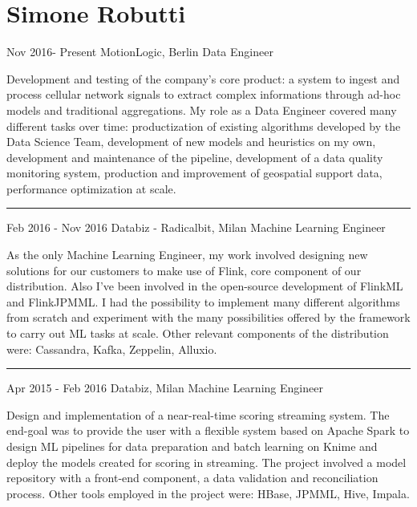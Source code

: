\documentclass{tccv}
\begin{document}
\part{Simone Robutti}

\begin{eventlist}

\item{Nov 2016- Present}
     {MotionLogic, Berlin}
     {Data Engineer}

Development and testing of the company's core product: a system to ingest and process cellular network signals to extract complex informations through ad-hoc models and traditional aggregations. My role as a Data Engineer covered many different tasks over time: productization of existing algorithms developed by the Data Science Team, development of new models and heuristics on my own, development and maintenance of the pipeline, development of a data quality monitoring system, production and improvement of geospatial support data, performance optimization at scale.


\noindent\hfil\rule{0.3\textwidth}{.4pt}

\item{Feb 2016 - Nov 2016}
{Databiz - Radicalbit, Milan}
{Machine Learning Engineer}

As the only Machine Learning Engineer, my work involved designing new solutions for our customers to make use of Flink, core component of our distribution. Also I've been involved in the open-source development of FlinkML and FlinkJPMML. I had the possibility to implement many different algorithms from scratch and experiment with the many possibilities offered by the framework to carry out ML tasks at scale. Other relevant components of the distribution were: Cassandra, Kafka, Zeppelin, Alluxio.

\noindent\hfil\rule{0.3\textwidth}{.4pt}

\item{Apr 2015 - Feb 2016}
{Databiz, Milan}
{Machine Learning Engineer}

Design and implementation of a near-real-time scoring streaming system. The end-goal was to provide the user with a flexible system based on Apache Spark to design ML pipelines for data preparation and batch learning on Knime and deploy the models created for scoring in streaming. The project involved a model repository with a front-end component, a data validation and reconciliation process. Other tools employed in the project were: HBase, JPMML, Hive, Impala.

\end{eventlist}
\end{document}
